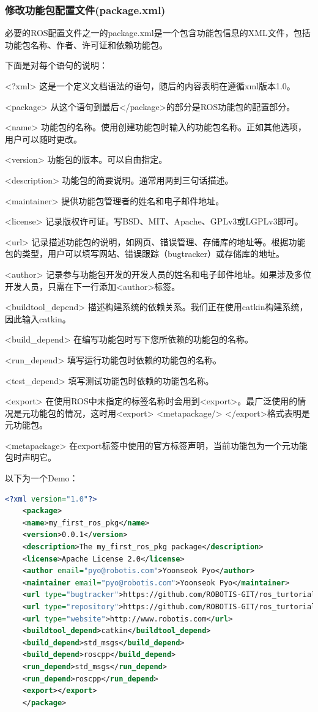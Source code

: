 \documentclass[geye,green,kindle,cn]{elegantnote}
\begin{document}
\subsubsection{修改功能包配置文件(package.xml)}
必要的ROS配置文件之一的package.xml是一个包含功能包信息的XML文件，包括 功能包名称、作者、许可证和依赖功能包。

下面是对每个语句的说明：

<?xml>   这是一个定义文档语法的语句，随后的内容表明在遵循xml版本1.0。

<package>   从这个语句到最后</package>的部分是ROS功能包的配置部分。 

<name>    功能包的名称。使用创建功能包时输入的功能包名称。正如其他选项，用户可以随时更改。

<version>   功能包的版本。可以自由指定。

<description>  功能包的简要说明。通常用两到三句话描述。

<maintainer>  提供功能包管理者的姓名和电子邮件地址。

<license>   记录版权许可证。写BSD、MIT、Apache、GPLv3或LGPLv3即可。

<url>    记录描述功能包的说明，如网页、错误管理、存储库的地址等。根据功能包的类型，用户可以填写网站、错误跟踪（bugtracker）或存储库的地址。

<author>    记录参与功能包开发的开发人员的姓名和电子邮件地址。如果涉及多位开发人员，只需在下一行添加<author>标签。

<buildtool\_depend>  描述构建系统的依赖关系。我们正在使用catkin构建系统，因此输入catkin。

<build\_depend> 在编写功能包时写下您所依赖的功能包的名称。

<run\_depend> 填写运行功能包时依赖的功能包的名称。

<test\_depend> 填写测试功能包时依赖的功能包名称。

<export>    在使用ROS中未指定的标签名称时会用到<export>。最广泛使用的情况是元功能包的情况，这时用<export> <metapackage/> </export>格式表明是元功能包。

<metapackage>  在export标签中使用的官方标签声明，当前功能包为一个元功能包时声明它。

以下为一个Demo：
\begin{lstlisting}[frame=single,language=xml]
    <?xml version="1.0"?>
    <package> 
    <name>my_first_ros_pkg</name>
    <version>0.0.1</version>
    <description>The my_first_ros_pkg package</description>
    <license>Apache License 2.0</license>
    <author email="pyo@robotis.com">Yoonseok Pyo</author>
    <maintainer email="pyo@robotis.com">Yoonseok Pyo</maintainer>
    <url type="bugtracker">https://github.com/ROBOTIS-GIT/ros_turtorials/issues</url>
    <url type="repository">https://github.com/ROBOTIS-GIT/ros_turtorials.git</url>
    <url type="website">http://www.robotis.com</url>
    <buildtool_depend>catkin</buildtool_depend>
    <build_depend>std_msgs</build_depend>
    <build_depend>roscpp</build_depend>
    <run_depend>std_msgs</run_depend>
    <run_depend>roscpp</run_depend>
    <export></export>
    </package>
\end{lstlisting}
\end{document}

